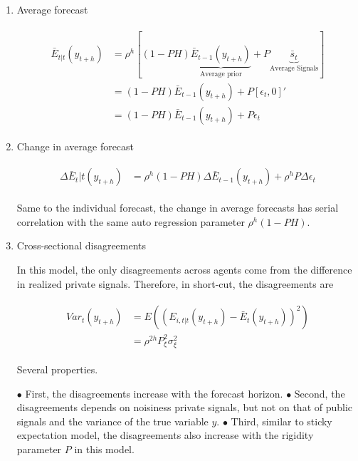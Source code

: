\documentclass[]{article}
\begin{document}
\begin{enumerate}
	
\item Average forecast


\begin{eqnarray}
\begin{aligned}
\bar E_{t|t} (y_{t+h}) & = \rho^h [(1-PH) \underbrace{\bar E_{t-1}(y_{t+h})}_{\text{Average prior}} + P \underbrace{\bar s_{t}}_{\text{Average Signals}}] \\
& = (1-PH) \bar E_{t-1}(y_{t+h}) + P [\epsilon_t, 0]' \\
& = (1-PH) \bar E_{t-1}(y_{t+h}) + P \epsilon_t
\end{aligned}
\end{eqnarray}

\item Change in average forecast

\begin{eqnarray}
\begin{aligned}
\Delta \bar E_t|t (y_{t+h}) & = \rho^h (1-PH) \Delta \bar E_{t-1}(y_{t+h}) + \rho^h P \Delta \epsilon_t
\end{aligned}
\end{eqnarray}


Same to the individual forecast, the change in average forecasts has serial correlation with the same auto regression parameter $\rho^h(1-PH)$.  

\item Cross-sectional disagreements

In this model, the only disagreements across agents come from the difference in realized private signals. Therefore, in short-cut, the disagreements are 

\begin{eqnarray}
\begin{aligned}
Var_t(y_{t+h}) & = E((E_{i,t|t}(y_{t+h}) - \bar E_t(y_{t+h}))^2) \\
& = \rho^{2h} P^2_\xi \sigma^2_\xi  
\end{aligned}
\end{eqnarray}


Several properties. 

$\bullet$ First, the disagreements increase with the forecast horizon. 
$\bullet$  Second, the disagreements depends on noisiness private signals, but not on that of public signals and the variance of the true variable $y$. 
$\bullet$  Third, similar to sticky expectation model, the disagreements also increase with the rigidity parameter $P$ in this model.



\end{enumerate}
\end{document}
